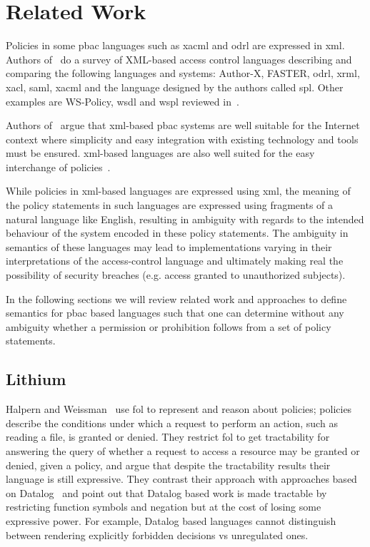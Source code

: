 \chapter{Related Work}


Policies in some \ac{pbac} languages such as \ac{xacml} and \ac{odrl} are expressed in \ac{xml}. Authors of~\cite{surveyXML} do a survey of XML-based access control languages describing and comparing the following languages and systems: Author-X, FASTER, \ac{odrl}, \ac{xrml}, \ac{xacl}, \ac{saml}, \ac{xacml} and the language designed by the authors called \ac{spl}. Other examples are WS-Policy, \ac{wsdl} and \ac{wspl} reviewed in~\cite{ArdagnaDVS04}.

Authors of~\cite{ArdagnaDVS04} argue that \ac{xml}-based \ac{pbac} systems are well suitable for the Internet context where simplicity and easy integration with existing technology and tools must be ensured. \ac{xml}-based languages are also well suited for the easy interchange of policies~\cite{ArdagnaDVS04}. 

While policies in \ac{xml}-based languages are expressed using \ac{xml}, the meaning of the policy statements in such languages are expressed using fragments of a natural language like English, resulting in ambiguity with regards to the intended behaviour of the system encoded in these policy statements. The ambiguity in semantics of these languages may lead to implementations varying in their interpretations of the access-control language and ultimately making real the possibility of security breaches (e.g. access granted to unauthorized subjects). 

In the following sections we will review related work and approaches to define semantics for \ac{pbac} based languages such that one can determine without any ambiguity whether a permission or prohibition follows from a set of policy statements.
 
\section{Lithium}
Halpern and Weissman~\cite{Halpern2008} use \ac{fol} to represent and reason about policies; policies describe the conditions under which a request to perform an action, such as reading a file, is granted or denied. They restrict \ac{fol} to get tractability for answering the query of whether a request to access a resource may be granted or denied, given a policy, and argue that despite the tractability results their language is still expressive. They contrast their approach with approaches based on Datalog~\cite{datalog} and point out that Datalog based work is made tractable by restricting function symbols and negation but at the cost of losing some expressive power. For example, Datalog based languages cannot distinguish between rendering explicitly forbidden decisions vs unregulated ones.

